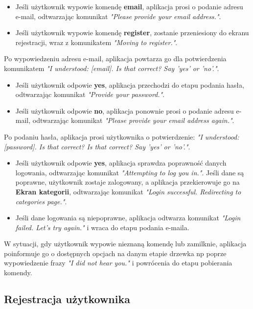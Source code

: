 \begin{itemize}
    \item Jeśli użytkownik wypowie komendę \textbf{email}, aplikacja prosi o podanie adresu e-mail, odtwarzając komunikat \textit{"Please provide your email address."}.
    \item Jeśli użytkownik wypowie komendę \textbf{register}, zostanie przeniesiony do ekranu rejestracji, wraz z komunikatem \textit{"Moving to register."}.
\end{itemize}

Po wypowiedzeniu adresu e-mail, aplikacja powtarza go dla potwierdzenia komunikatem \textit{"I understood: [email]. Is that correct? Say 'yes' or 'no'."}.

\begin{itemize}
    \item Jeśli użytkownik odpowie \textbf{yes}, aplikacja przechodzi do etapu podania hasła, odtwarzając komunikat \textit{"Provide your password."}.
    \item Jeśli użytkownik odpowie \textbf{no}, aplikacja ponownie prosi o podanie adresu e-mail, odtwarzając komunikat \textit{"Please provide your email address again."}.
\end{itemize}

Po podaniu hasła, aplikacja prosi użytkownika o potwierdzenie: \textit{"I understood: [password]. Is that correct? Is that correct? Say 'yes' or 'no'."}.

\begin{itemize}
    \item Jeśli użytkownik odpowie \textbf{yes}, aplikacja sprawdza poprawność danych logowania, odtwarzając komunikat \textit{"Attempting to log you in."}. Jeśli dane są poprawne, użytkownik zostaje zalogowany, a aplikacja przekierowuje go na \textbf{Ekran kategorii}, odtwarzając komunikat \textit{"Login successful. Redirecting to categories page."}.
    \item Jeśli dane logowania są niepoprawne, aplikacja odtwarza komunikat \textit{"Login failed. Let's try again."} i wraca do etapu podania e-maila.
\end{itemize}


W sytuacji, gdy użytkownik wypowie nieznaną komendę lub zamilknie, aplikacja poinformuje go o dostępnych opcjach na danym etapie drzewka np poprze wypowiedzenie frazy \textit{"I did not hear you."} i powrócenia do etapu pobierania komendy.

\subsection{Rejestracja użytkownika}

